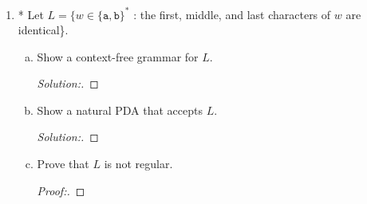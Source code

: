 \documentclass[10pt]{article}
\begin{document}
\begin{enumerate}[1)]

\item
* Let $L = \{w \in \{\texttt{a}, \texttt{b}\}^*$ : the first, middle, and last characters of $w$ are identical\}.
\begin{enumerate}[a)]
\item
Show a context-free grammar for $L$.
\begin{proof}[Solution:]
\end{proof}

\item
Show a natural PDA that accepts $L$.
\begin{proof}[Solution:]
\end{proof}

\item
Prove that $L$ is not regular.
\begin{proof}[Proof:]
\end{proof}
\end{enumerate}
\end{enumerate}
\end{document}
